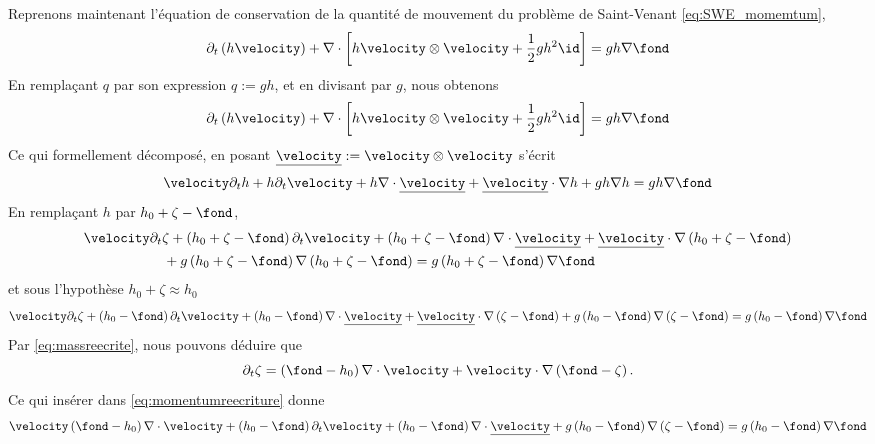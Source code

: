 \noindent Reprenons maintenant l'équation de conservation de la quantité de mouvement du problème de Saint-Venant \eqref{eq:SWE_momemtum},
\begin{equation}
	\partial_t \left(h\velocity\right) + \nabla \cdot \left[ h\velocity \otimes \velocity + \frac{1}{2}gh^2\id\right] = gh\nabla \fond
\end{equation}
En remplaçant $q$ par son expression $q:= gh$, et en divisant par $g$, nous obtenons
\begin{equation}
	\partial_t \left(h\velocity\right) + \nabla \cdot \left[ h \velocity \otimes \velocity + \frac{1}{2}gh^2\id\right] = gh\nabla \fond
\end{equation}
Ce qui formellement décomposé, en posant $\underline{\velocity} := \velocity \otimes \velocity$ s'écrit
\begin{equation}
	\velocity\partial_t h +h\partial_t\velocity + h \nabla \cdot \underline{\velocity} +\underline{\velocity}\cdot \nabla h + gh\nabla h = gh\nabla \fond
\end{equation}
	En remplaçant $h$ par $h_0 + \zeta - \fond$,
\begin{align}
	&\velocity\partial_t \zeta +\left(h_0+\zeta-\fond\right)\partial_t\velocity + \left(h_0+\zeta-\fond\right) \nabla \cdot \underline{\velocity} +\underline{\velocity}\cdot \nabla \left(h_0+\zeta-\fond\right)\nonumber \\
	&\hspace{2cm}+ g\left(h_0+\zeta-\fond\right)\nabla \left(h_0+\zeta-\fond\right) = g\left(h_0+\zeta-\fond\right)\nabla \fond
\end{align}
 et sous l'hypothèse $h_0+\zeta \approx h_0$
\begin{equation}
	\velocity\partial_t \zeta +\left(h_0-\fond\right)\partial_t\velocity + \left(h_0-\fond\right) \nabla \cdot \underline{\velocity} +\underline{\velocity}\cdot \nabla \left(\zeta-\fond\right)+ g\left(h_0-\fond\right)\nabla \left(\zeta-\fond\right) = g\left(h_0-\fond\right)\nabla \fond \label{eq:momentumreecriture}
\end{equation}
Par \eqref{eq:massreecrite}, nous pouvons déduire que
\begin{equation}
	\partial_t \zeta = \left(\fond - h_0\right)\nabla \cdot \velocity + \velocity \cdot \nabla \left(\fond - \zeta\right).
\end{equation}
Ce qui insérer dans \eqref{eq:momentumreecriture} donne
\begin{equation}
	\velocity\left(\fond - h_0\right)\nabla \cdot \velocity +\left(h_0-\fond\right)\partial_t\velocity + \left(h_0-\fond\right) \nabla \cdot \underline{\velocity} + g\left(h_0-\fond\right)\nabla \left(\zeta-\fond\right) = g\left(h_0-\fond\right)\nabla \fond \label{eq:momentumreecriture_2}
\end{equation}
